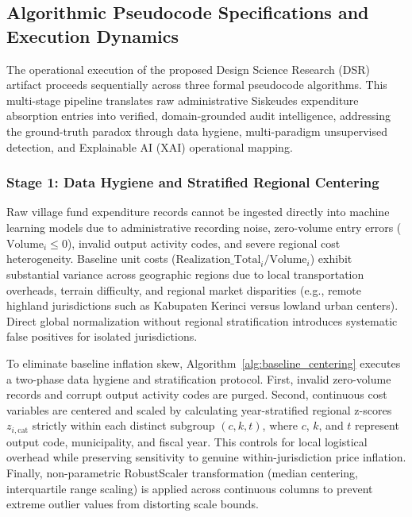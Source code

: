 \documentclass[runningheads]{llncs}
\begin{document}
\subsection{Algorithmic Pseudocode Specifications and Execution Dynamics}

The operational execution of the proposed Design Science Research (DSR) artifact proceeds sequentially across three formal pseudocode algorithms. This multi-stage pipeline translates raw administrative Siskeudes expenditure absorption entries into verified, domain-grounded audit intelligence, addressing the ground-truth paradox through data hygiene, multi-paradigm unsupervised detection, and Explainable AI (XAI) operational mapping.

\subsubsection{Stage 1: Data Hygiene and Stratified Regional Centering}
Raw village fund expenditure records cannot be ingested directly into machine learning models due to administrative recording noise, zero-volume entry errors ($\text{Volume}_i \le 0$), invalid output activity codes, and severe regional cost heterogeneity. Baseline unit costs ($\text{Realization\_Total}_i / \text{Volume}_i$) exhibit substantial variance across geographic regions due to local transportation overheads, terrain difficulty, and regional market disparities (e.g., remote highland jurisdictions such as Kabupaten Kerinci versus lowland urban centers). Direct global normalization without regional stratification introduces systematic false positives for isolated jurisdictions. 

To eliminate baseline inflation skew, Algorithm~\ref{alg:baseline_centering} executes a two-phase data hygiene and stratification protocol. First, invalid zero-volume records and corrupt output activity codes are purged. Second, continuous cost variables are centered and scaled by calculating year-stratified regional z-scores $z_{i, \text{cat}}$ strictly within each distinct subgroup $(c, k, t)$, where $c$, $k$, and $t$ represent output code, municipality, and fiscal year. This controls for local logistical overhead while preserving sensitivity to genuine within-jurisdiction price inflation. Finally, non-parametric RobustScaler transformation (median centering, interquartile range scaling) is applied across continuous columns to prevent extreme outlier values from distorting scale bounds.
\end{document}
